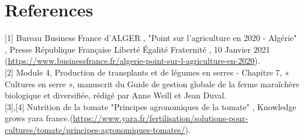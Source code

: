 \chapter*{References} 
\label{chap:reference} 
[1] Bureau Business France d'ALGER , "Point sur l'agriculture en 2020 - Algérie" , Presse République Française Liberté Égalité Fraternité , 10 Janvier 2021 (\url {https://www.businessfrance.fr/algerie-point-sur-l-agriculture-en-2020}).
\\



    [2] Module 4, Production de transplants et de légumes en serres - Chapitre 7, « Cultures en serre », manuscrit du Guide de gestion globale de la ferme maraîchère biologique et diversifiée, rédigé par Anne Weill et Jean Duval.
    \\ 

  [3],[4] Nutrition de la tomate "Principes agronomiques de la tomate" , Knowledge grows yara france.(\url {https://www.yara.fr/fertilisation/solutions-pour-cultures/tomate/principes-agronomiques-tomates/}).


